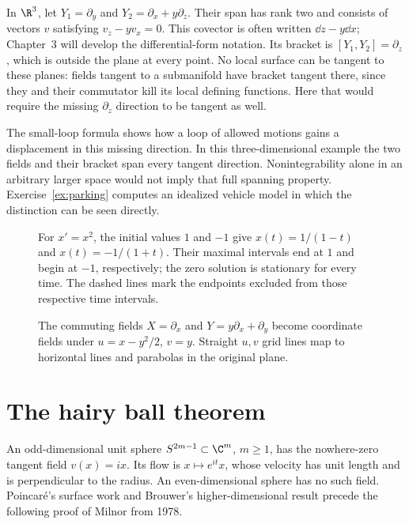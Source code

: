 \begin{example}\label{ex:contact}
In $\R^3$, let $Y_1=\partial_y$ and $Y_2=\partial_x+y\partial_z$. Their span has rank two and consists of vectors $v$ satisfying $v_z-yv_x=0$. This covector is often written $\dd z-y\dd x$; Chapter~3 will develop the differential-form notation. Its bracket is $[Y_1,Y_2]=\partial_z$, which is outside the plane at every point. No local surface can be tangent to these planes: fields tangent to a submanifold have bracket tangent there, since they and their commutator kill its local defining functions. Here that would require the missing $\partial_z$ direction to be tangent as well.

The small-loop formula shows how a loop of allowed motions gains a displacement in this missing direction. In this three-dimensional example the two fields and their bracket span every tangent direction. Nonintegrability alone in an arbitrary larger space would not imply that full spanning property. Exercise~\ref{ex:parking} computes an idealized vehicle model in which the distinction can be seen directly.
\end{example}

\begin{figure}[ht]
\centering{}
\caption{For $x'=x^2$, the initial values $1$ and $-1$ give $x(t)=1/(1-t)$ and $x(t)=-1/(1+t)$. Their maximal intervals end at $1$ and begin at $-1$, respectively; the zero solution is stationary for every time. The dashed lines mark the endpoints excluded from those respective time intervals.}
\label{fig:v9-ch02-escape-times}
\end{figure}

\begin{figure}[ht]
\centering{}
\caption{The commuting fields $X=\partial_x$ and $Y=y\partial_x+\partial_y$ become coordinate fields under $u=x-y^2/2$, $v=y$. Straight $u,v$ grid lines map to horizontal lines and parabolas in the original plane.}
\label{fig:v9-ch02-flow-coordinates}
\end{figure}

\section{The hairy ball theorem}

An odd-dimensional unit sphere $S^{2m-1}\subset\C^m$, $m\ge1$, has the nowhere-zero tangent field $v(x)=ix$. Its flow is $x\mapsto e^{it}x$, whose velocity has unit length and is perpendicular to the radius. An even-dimensional sphere has no such field. Poincaré's surface work and Brouwer's higher-dimensional result precede the following proof of Milnor from 1978.

